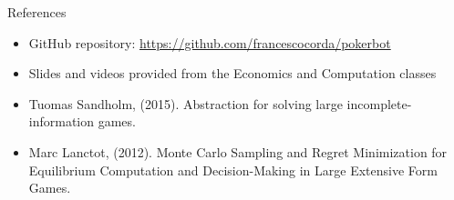 \documentclass[11pt]{beamer}
\begin{document}
\begin{frame}{References}
\begin{itemize}
\item GitHub repository: \url{https://github.com/francescocorda/pokerbot}
\item Slides and videos provided from the Economics and Computation classes
\item Tuomas Sandholm, (2015). Abstraction for solving large incomplete-information games.
\item Marc Lanctot, (2012). Monte Carlo Sampling and Regret Minimization for Equilibrium Computation and Decision-Making in Large Extensive Form Games.

\end{itemize}
\end{frame}
\end{document}
